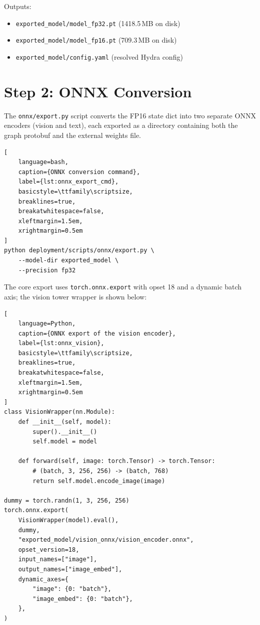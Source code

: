 \documentclass[../main.tex]{subfiles}
\begin{document}
\noindent Outputs:
\begin{itemize}[itemsep=0.3em, topsep=0.3em]
    \item \texttt{exported\_model/model\_fp32.pt} (1418.5\,MB on disk)
    \item \texttt{exported\_model/model\_fp16.pt} (709.3\,MB on disk)
    \item \texttt{exported\_model/config.yaml} (resolved Hydra config)
\end{itemize}

\section{Step 2: ONNX Conversion}

\noindent The \texttt{onnx/export.py} script converts the FP16 state dict into two separate ONNX encoders (vision and text), each exported as a directory containing both the graph protobuf and the external weights file.

\begin{lstlisting}[
    language=bash,
    caption={ONNX conversion command},
    label={lst:onnx_export_cmd},
    basicstyle=\ttfamily\scriptsize,
    breaklines=true,
    breakatwhitespace=false,
    xleftmargin=1.5em,
    xrightmargin=0.5em
]
python deployment/scripts/onnx/export.py \
    --model-dir exported_model \
    --precision fp32
\end{lstlisting}

\noindent The core export uses \texttt{torch.onnx.export} with opset 18 and a dynamic batch axis; the vision tower wrapper is shown below:

\begin{lstlisting}[
    language=Python,
    caption={ONNX export of the vision encoder},
    label={lst:onnx_vision},
    basicstyle=\ttfamily\scriptsize,
    breaklines=true,
    breakatwhitespace=false,
    xleftmargin=1.5em,
    xrightmargin=0.5em
]
class VisionWrapper(nn.Module):
    def __init__(self, model):
        super().__init__()
        self.model = model

    def forward(self, image: torch.Tensor) -> torch.Tensor:
        # (batch, 3, 256, 256) -> (batch, 768)
        return self.model.encode_image(image)

dummy = torch.randn(1, 3, 256, 256)
torch.onnx.export(
    VisionWrapper(model).eval(),
    dummy,
    "exported_model/vision_onnx/vision_encoder.onnx",
    opset_version=18,
    input_names=["image"],
    output_names=["image_embed"],
    dynamic_axes={
        "image": {0: "batch"},
        "image_embed": {0: "batch"},
    },
)
\end{lstlisting}
\end{document}
